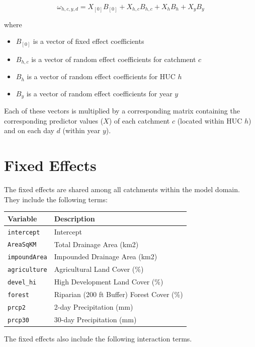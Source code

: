 \documentclass[]{book}
\providecommand{\tightlist}{%
  \setlength{\itemsep}{0pt}\setlength{\parskip}{0pt}}
\begin{document}
\[\omega_{h,c,y,d} = X_{[0]} B_{[0]} + X_{h,c} B_{h,c} + X_{h} B_{h} + X_{y} B_{y}\]

where

\begin{itemize}
\tightlist
\item
  \(B_{[0]}\) is a vector of fixed effect coefficients
\item
  \(B_{h,c}\) is a vector of random effect coefficients for catchment \(c\)
\item
  \(B_{h}\) is a vector of random effect coefficients for HUC \(h\)
\item
  \(B_{y}\) is a vector of random effect coefficients for year \(y\)
\end{itemize}

Each of these vectors is multiplied by a corresponding matrix containing the corresponding predictor values (\(X\)) of each catchment \(c\) (located within HUC \(h\)) and on each day \(d\) (within year \(y\)).

\hypertarget{fixed-effects}{%
\section{Fixed Effects}\label{fixed-effects}}

The fixed effects are shared among all catchments within the model domain. They include the following terms:

\begin{longtable}[]{@{}ll@{}}
\toprule
Variable & Description\tabularnewline
\midrule
\endhead
\texttt{intercept} & Intercept\tabularnewline
\texttt{AreaSqKM} & Total Drainage Area (km2)\tabularnewline
\texttt{impoundArea} & Impounded Drainage Area (km2)\tabularnewline
\texttt{agriculture} & Agricultural Land Cover (\%)\tabularnewline
\texttt{devel\_hi} & High Development Land Cover (\%)\tabularnewline
\texttt{forest} & Riparian (200 ft Buffer) Forest Cover (\%)\tabularnewline
\texttt{prcp2} & 2-day Precipitation (mm)\tabularnewline
\texttt{prcp30} & 30-day Precipitation (mm)\tabularnewline
\bottomrule
\end{longtable}

The fixed effects also include the following interaction terms.
\end{document}
